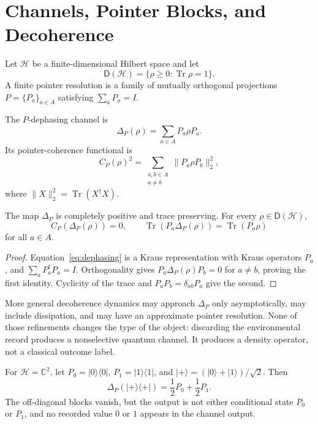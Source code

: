\documentclass[11pt]{article}
\newcommand{\Hilb}{\mathcal H}
\newcommand{\Dens}{\mathsf D}
\newcommand{\Tr}{\operatorname{Tr}}
\begin{document}
\section{Channels, Pointer Blocks, and Decoherence}

Let $\Hilb$ be a finite-dimensional Hilbert space and let
\[
 \Dens(\Hilb)=\{\rho\geq0:\Tr\rho=1\}.
\]
A finite pointer resolution is a family of mutually orthogonal projections
$P=\{P_a\}_{a\in A}$ satisfying $\sum_aP_a=I$.

\begin{definition}
The $P$-dephasing channel is
\begin{equation}
 \Delta_P(\rho)=\sum_{a\in A}P_a\rho P_a.
 \label{eq:dephasing}
\end{equation}
Its pointer-coherence functional is
\begin{equation}
 C_P(\rho)^2
 =\sum_{\substack{a,b\in A\\a\neq b}}
   \lVert P_a\rho P_b\rVert_2^2,
 \label{eq:coherence}
\end{equation}
where $\lVert X\rVert_2^2=\Tr(X^\dagger X)$.
\end{definition}

\begin{proposition}\label{prop:dephasing}
The map $\Delta_P$ is completely positive and trace preserving.  For every
$\rho\in\Dens(\Hilb)$,
\[
 C_P(\Delta_P(\rho))=0,
 \qquad
 \Tr(P_a\Delta_P(\rho))=\Tr(P_a\rho)
\]
for all $a\in A$.
\end{proposition}

\begin{proof}
Equation~\eqref{eq:dephasing} is a Kraus representation with Kraus operators
$P_a$, and $\sum_aP_a^\dagger P_a=I$.  Orthogonality gives
$P_a\Delta_P(\rho)P_b=0$ for $a\neq b$, proving the first identity.  Cyclicity
of the trace and $P_aP_b=\delta_{ab}P_a$ give the second.
\end{proof}

More general decoherence dynamics may approach $\Delta_P$ only
asymptotically, may include dissipation, and may have an approximate pointer
resolution.  None of those refinements changes the type of the object:
discarding the environmental record produces a nonselective quantum channel.
It produces a density operator, not a classical outcome label.

\begin{example}\label{ex:qubit}
For $\Hilb=\mathbb C^2$, let $P_0=\lvert0\rangle\langle0\rvert$,
$P_1=\lvert1\rangle\langle1\rvert$, and
$\lvert+\rangle=(\lvert0\rangle+\lvert1\rangle)/\sqrt2$.  Then
\[
 \Delta_P(\lvert+\rangle\langle+\rvert)
 =\frac12P_0+\frac12P_1.
\]
The off-diagonal blocks vanish, but the output is not either conditional
state $P_0$ or $P_1$, and no recorded value $0$ or $1$ appears in the channel
output.
\end{example}
\end{document}

